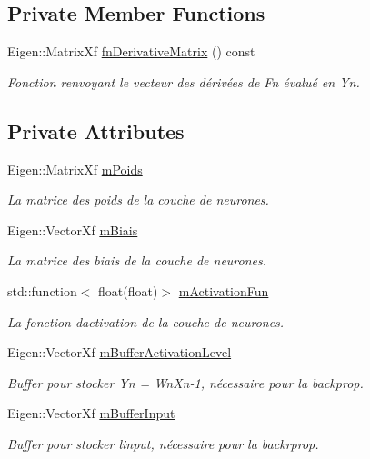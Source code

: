 \subsection*{Private Member Functions}
\begin{DoxyCompactItemize}
\item 
Eigen\+::\+Matrix\+Xf \hyperlink{classNeuronLayer_a8b4572b9b3cd779233f8c269c3eca608}{fn\+Derivative\+Matrix} () const
\begin{DoxyCompactList}\small\item\em Fonction renvoyant le vecteur des dérivées de Fn évalué en Yn. \end{DoxyCompactList}\end{DoxyCompactItemize}
\subsection*{Private Attributes}
\begin{DoxyCompactItemize}
\item 
Eigen\+::\+Matrix\+Xf \hyperlink{classNeuronLayer_ab6aaf5dc22c97ba46db5ac5e8715ed8f}{m\+Poids}
\begin{DoxyCompactList}\small\item\em La matrice des poids de la couche de neurones. \end{DoxyCompactList}\item 
Eigen\+::\+Vector\+Xf \hyperlink{classNeuronLayer_a6d1c0d70051d87dace0cdf654d866a4a}{m\+Biais}
\begin{DoxyCompactList}\small\item\em La matrice des biais de la couche de neurones. \end{DoxyCompactList}\item 
std\+::function$<$ float(float)$>$ \hyperlink{classNeuronLayer_ac0ff52b79f1a068e75f0eb0309b5e683}{m\+Activation\+Fun}
\begin{DoxyCompactList}\small\item\em La fonction d\textquotesingle{}activation de la couche de neurones. \end{DoxyCompactList}\item 
Eigen\+::\+Vector\+Xf \hyperlink{classNeuronLayer_a5b5ccadbab1d38fd3b09fcab7dc01148}{m\+Buffer\+Activation\+Level}
\begin{DoxyCompactList}\small\item\em Buffer pour stocker Yn = Wn\+Xn-\/1, nécessaire pour la backprop. \end{DoxyCompactList}\item 
Eigen\+::\+Vector\+Xf \hyperlink{classNeuronLayer_ab5a3fc010c33628e37b5a19d370978e9}{m\+Buffer\+Input}
\begin{DoxyCompactList}\small\item\em Buffer pour stocker l\textquotesingle{}input, nécessaire pour la backrprop. \end{DoxyCompactList}\end{DoxyCompactItemize}
